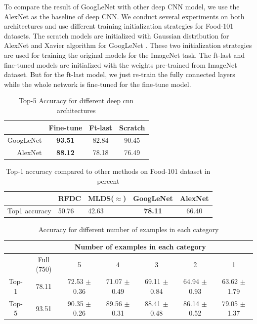 To compare the result of GoogLeNet with other deep CNN model, we use the AlexNet as the baseline of deep CNN.
We conduct several experiments on both architectures and use different training initialization strategies for Food-101 datasets. The scratch models are initialized with Gaussian distribution for AlexNet and Xavier algorithm for GoogLeNet \cite{glorot2010understanding}. These two initialization strategies are used for training the original models for the ImageNet task. The ft-last and fine-tuned models are initialized with the weights pre-trained from ImageNet dataset. But for the ft-last model, we just re-train the fully connected layers while the whole network is fine-tuned for the fine-tune model.
\begin{table}[htbp]
  \centering
  \caption{Top-5 Accuracy for different deep cnn architectures}
    \begin{tabular}{r|ccc}
    \toprule
          & Fine-tune & Ft-last & Scratch \\
    \midrule
    GoogLeNet & \textbf{93.51} & 82.84 & 90.45 \\
    AlexNet & \textbf{88.12} & 78.18 & 76.49 \\
    \bottomrule
    \end{tabular}%
  \label{tab:ft}%
\end{table}%



\begin{table}[htbp]
  \centering
  \caption{Top-1 accuracy compared to other methods on Food-101 dataset in percent}
    \begin{tabular}{c|C{3cm}C{3cm}cc}
    \toprule
          & RFDC\cite{bossard2014food} & MLDS($\approx$\cite{singh2012unsupervised}) & GoogLeNet & AlexNet \\
    \midrule
    Top1 accuracy & 50.76 & 42.63& \textbf{78.11 }& 66.40 \\
    \bottomrule
    \end{tabular}%
    \label{tab:101}
\end{table}%
\begin{table}[htbp]
  \centering
  \caption{Accuracy for different number of examples in each category}
    \begin{tabular}{c|c|c|c|c|c|c}
    \toprule
        &\multicolumn{6}{c}{Number of examples in each category }\\
        \midrule
          & Full (750)   &  5     & 4     & 3     & 2     & 1 \\
    \midrule
    Top-1  & 78.11& 72.53 $\pm$ 0.36& 71.07 $\pm$ 0.49& 69.11 $\pm$ 0.84& 64.94 $\pm$ 0.93& 63.62 $\pm$ 1.79 \\
    Top-5  & 93.51 & 90.35 $\pm$ 0.26& 89.56 $\pm$ 0.31 & 88.41 $\pm$ 0.48   & 86.14 $\pm$ 0.52& 79.05 $\pm$ 1.37 \\
    \bottomrule
    \end{tabular}%
  \label{tab:mini}%
\end{table}%


